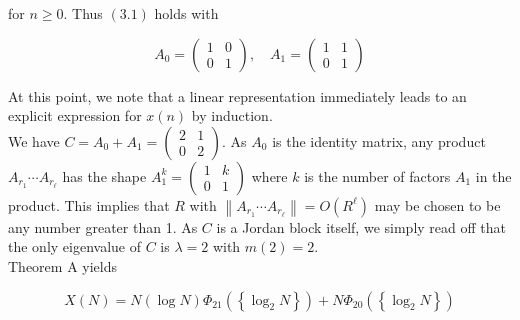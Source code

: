 for $n \geq 0$. Thus $(3.1)$ holds with

$$
A_{0}=\left(\begin{array}{ll}
	1 & 0 \\
	0 & 1
\end{array}\right), \quad A_{1}=\left(\begin{array}{ll}
	1 & 1 \\
	0 & 1
\end{array}\right)
$$

At this point, we note that a linear representation immediately leads to an explicit expression for $x(n)$ by induction.
\\

We have $C=A_{0}+A_{1}=\left(\begin{array}{ll}2 & 1 \\ 0 & 2\end{array}\right)$. As $A_{0}$ is the identity matrix, any product $A_{r_{1}} \cdots A_{r_{\ell}}$ has the shape $A_{1}^{k}=\left(\begin{array}{ll}1 & k \\ 0 & 1\end{array}\right)$ where $k$ is the number of factors $A_{1}$ in the product. This implies that $R$ with $\left\|A_{r_{1}} \cdots A_{r_{\ell}}\right\|=O\left(R^{\ell}\right)$ may be chosen to be any number greater than 1. As $C$ is a Jordan block itself, we simply read off that the only eigenvalue of $C$ is $\lambda=2$ with $m(2)=2$.
\\

Theorem A yields

$$
X(N)=N(\log N) \Phi_{21}\left(\left\{\log _{2} N\right\}\right)+N \Phi_{20}\left(\left\{\log _{2} N\right\}\right)
$$



